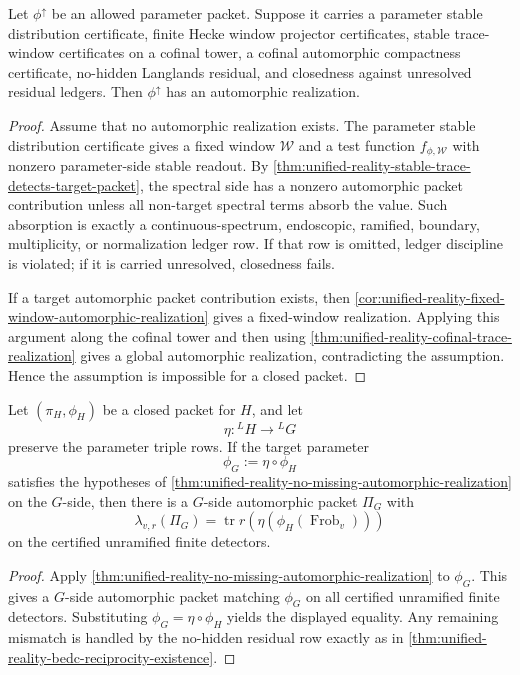 \begin{theorem}
\label{thm:unified-reality-no-missing-automorphic-realization}
Let $\phi^{\uparrow}$ be an allowed parameter packet. Suppose it carries
a parameter stable distribution certificate, finite Hecke window
projector certificates, stable trace-window certificates on a cofinal
tower, a cofinal automorphic compactness certificate, no-hidden
Langlands residual, and closedness against unresolved residual ledgers.
Then $\phi^{\uparrow}$ has an automorphic realization.
\end{theorem}
\begin{proof}
Assume that no automorphic realization exists. The parameter stable
distribution certificate gives a fixed window $\mathcal W$ and a test
function $f_{\phi,\mathcal W}$ with nonzero parameter-side stable
readout. By
\autoref{thm:unified-reality-stable-trace-detects-target-packet}, the
spectral side has a nonzero automorphic packet contribution unless all
non-target spectral terms absorb the value. Such absorption is exactly a
continuous-spectrum, endoscopic, ramified, boundary, multiplicity, or
normalization ledger row. If that row is omitted, ledger discipline is
violated; if it is carried unresolved, closedness fails.

If a target automorphic packet contribution exists, then
\autoref{cor:unified-reality-fixed-window-automorphic-realization}
gives a fixed-window realization. Applying this argument along the
cofinal tower and then using
\autoref{thm:unified-reality-cofinal-trace-realization} gives a global
automorphic realization, contradicting the assumption. Hence the
assumption is impossible for a closed packet.
\end{proof}

\begin{theorem}
\label{thm:unified-reality-functorial-existence-trace-window-closure}
Let $(\pi_H,\phi_H)$ be a closed packet for $H$, and let
$$
\eta:{}^LH\to{}^LG
$$
preserve the parameter triple rows. If the target parameter
$$
\phi_G:=\eta\circ\phi_H
$$
satisfies the hypotheses of
\autoref{thm:unified-reality-no-missing-automorphic-realization} on the
$G$-side, then there is a $G$-side automorphic packet $\Pi_G$ with
$$
\lambda_{v,r}(\Pi_G)
=
\operatorname{tr}r(\eta(\phi_H(\operatorname{Frob}_v)))
$$
on the certified unramified finite detectors.
\end{theorem}
\begin{proof}
Apply
\autoref{thm:unified-reality-no-missing-automorphic-realization} to
$\phi_G$. This gives a $G$-side automorphic packet matching
$\phi_G$ on all certified unramified finite detectors. Substituting
$\phi_G=\eta\circ\phi_H$ yields the displayed equality. Any remaining
mismatch is handled by the no-hidden residual row exactly as in
\autoref{thm:unified-reality-bedc-reciprocity-existence}.
\end{proof}

